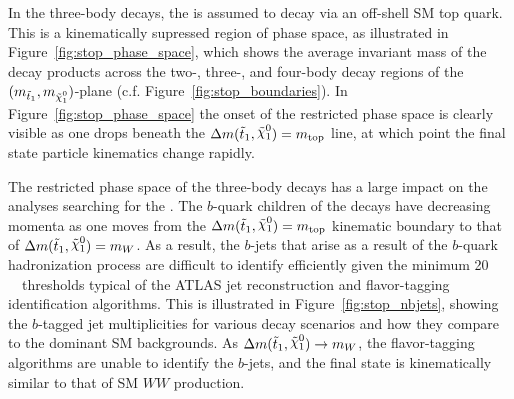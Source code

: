 In the three-body decays, the \stopone is assumed to decay via an off-shell SM top quark.
This is a kinematically supressed region of phase space, as illustrated in Figure~\ref{fig:stop_phase_space},
which shows the average invariant mass of the \stopone decay products across the
two-, three-, and four-body decay regions of the $(m_{\stopone}, m_{\ninoone})$-plane (c.f. Figure~\ref{fig:stop_boundaries}).
In Figure~\ref{fig:stop_phase_space} the onset of the restricted phase space is clearly
visible as one drops beneath the $\sdiff = m_{\text{top}}$ line, at which point the final
state particle kinematics change rapidly.

The restricted phase space of the three-body \stopone decays has a large
impact on the analyses searching for the \stopone.
The $b$-quark children of the \stopone decays have decreasing momenta as one
moves from the $\sdiff = m_{\text{top}}$ kinematic boundary to that of $\sdiff = m_{W}$.
As a result, the $b$-jets that arise as a result of the $b$-quark hadronization process
are difficult to identify efficiently given the minimum 20\,\GeV~\pT~thresholds typical
of the ATLAS jet reconstruction and flavor-tagging identification algorithms.
This is illustrated in Figure~\ref{fig:stop_nbjets}, showing the $b$-tagged jet multiplicities
for various \stopone decay scenarios and how they compare to the dominant SM backgrounds.
As $\sdiff \rightarrow m_W$, the flavor-tagging algorithms are unable to identify the $b$-jets,
and the final state is kinematically similar to that of SM $WW$ production.

